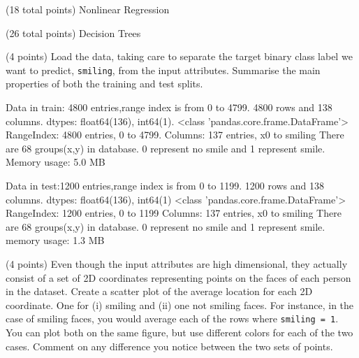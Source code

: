 \documentclass[12pt]{article}
\begin{document}
\begin{question}{(18 total points) Nonlinear Regression}
\begin{subquestion}
\end{subquestion}



\end{question}






\clearpage


\begin{question}{(26 total points) Decision Trees}





%
%
\begin{subquestion}{(4 points) Load the data, taking care to separate the target binary class label we want to predict, \texttt{smiling}, from the input attributes. 
Summarise the main properties of both the training and test splits. 
}


\begin{answerbox}{12em}
Data in train: 4800 entries,range index is from 0 to 4799. 4800 rows and 138 columns. dtypes: float64(136), int64(1).
<class 'pandas.core.frame.DataFrame'>
RangeIndex: 4800 entries, 0 to 4799.  Columns: 137 entries, x0 to smiling
There are 68 groups(x,y) in database. 0 represent no smile and 1 represent smile. 
Memory usage: 5.0 MB

Data in test:1200 entries,range index is from 0 to 1199. 1200 rows and 138 columns. dtypes: float64(136), int64(1)
<class 'pandas.core.frame.DataFrame'>
RangeIndex: 1200 entries, 0 to 1199
Columns: 137 entries, x0 to smiling
There are 68 groups(x,y) in database. 0 represent no smile and 1 represent smile.
memory usage: 1.3 MB



\end{answerbox}



\end{subquestion}


%
%
\begin{subquestion}{(4 points) Even though the input attributes are high dimensional, they actually consist of a set of 2D coordinates representing points on the faces of each person in the dataset. 
Create a scatter plot of the average location for each 2D coordinate. One for (i) smiling and (ii) one not smiling faces. 
For instance, in the case of smiling faces, you would average each of the rows where \texttt{smiling = 1}. 
You can plot both on the same figure, but use different colors for each of the two cases. 
Comment on any difference you notice between the two sets of points. \\
}



\end{subquestion}
\end{question}
\end{document}
